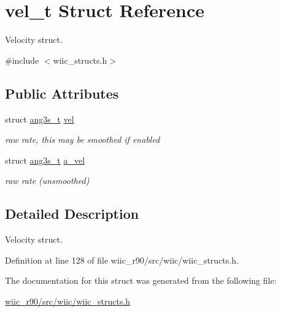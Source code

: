 \hypertarget{structvel__t}{\section{vel\-\_\-t Struct Reference}
\label{structvel__t}
}


Velocity struct.  




{\ttfamily \#include $<$wiic\-\_\-structs.\-h$>$}

\subsection*{Public Attributes}
\begin{DoxyCompactItemize}
\item 
\hypertarget{structvel__t_a76865c7b30e92bcae2097ec2b46aa692}{struct \hyperlink{structang3s__t}{ang3s\-\_\-t} \hyperlink{structvel__t_a76865c7b30e92bcae2097ec2b46aa692}{vel}}\label{structvel__t_a76865c7b30e92bcae2097ec2b46aa692}

\begin{DoxyCompactList}\small\item\em raw rate, this may be smoothed if enabled \end{DoxyCompactList}\item 
\hypertarget{structvel__t_a5443db069cfca456f3b8f5de9aaf1422}{struct \hyperlink{structang3s__t}{ang3s\-\_\-t} \hyperlink{structvel__t_a5443db069cfca456f3b8f5de9aaf1422}{a\-\_\-vel}}\label{structvel__t_a5443db069cfca456f3b8f5de9aaf1422}

\begin{DoxyCompactList}\small\item\em raw rate (unsmoothed) \end{DoxyCompactList}\end{DoxyCompactItemize}


\subsection{Detailed Description}
Velocity struct. 

Definition at line 128 of file wiic\-\_\-r90/src/wiic/wiic\-\_\-structs.\-h.



The documentation for this struct was generated from the following file\-:\begin{DoxyCompactItemize}
\item 
\hyperlink{wiic__r90_2src_2wiic_2wiic__structs_8h}{wiic\-\_\-r90/src/wiic/wiic\-\_\-structs.\-h}\end{DoxyCompactItemize}
